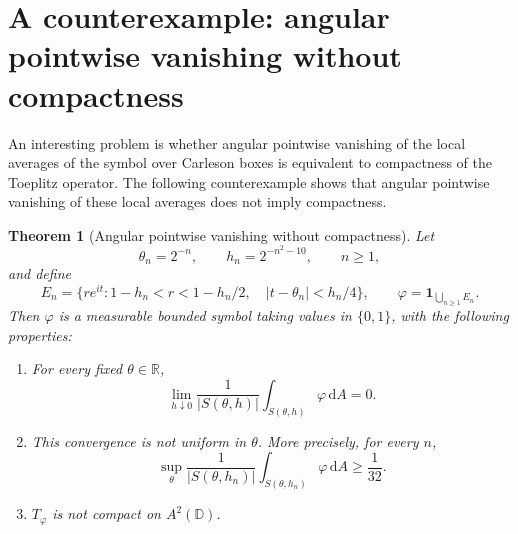 \documentclass[12pt,a4paper]{article}
\newtheorem{theorem}{Theorem}[section]
\theoremstyle{remark}
\newcommand{\D}{\mathbb D}
\newcommand{\dA}{\,\mathrm dA}
\newcommand{\A}{A^2(\D)}
\begin{document}
\section{A counterexample: angular pointwise vanishing without compactness}
An interesting problem is whether angular pointwise vanishing of the local averages of the symbol over Carleson boxes is equivalent to compactness of the Toeplitz operator. The following counterexample shows that angular pointwise vanishing of these local averages does not imply compactness.

\begin{theorem}[Angular pointwise vanishing without compactness]\label{thm:box-pointwise-counterexample}
Let
\[
\theta_n=2^{-n},\qquad h_n=2^{-n^2-10},\qquad n\ge1,
\]
and define
\[
E_n=\{re^{it}:1-h_n<r<1-h_n/2,\quad
                  |t-\theta_n|<h_n/4\},\qquad
\varphi=\mathbf1_{\bigcup_{n\ge1}E_n}.
\]
Then $\varphi$ is a measurable bounded symbol taking values in $\{0,1\}$, with the following properties:
\begin{enumerate}[label=\textnormal{(\roman*)}]
\item For every fixed $\theta\in\mathbb R$,
\begin{equation}\label{eq:counter-pointwise}
\lim_{h\downarrow0}\frac1{|S(\theta,h)|}
                  \int_{S(\theta,h)}\varphi\dA=0.
\end{equation}
\item This convergence is not uniform in $\theta$. More precisely, for every $n$,
\begin{equation}\label{eq:counter-nonuniform}
\sup_\theta\frac1{|S(\theta,h_n)|}
                  \int_{S(\theta,h_n)}\varphi\dA\ge\frac1{32}.
\end{equation}
\item $T_\varphi$ is not compact on $\A$.
\end{enumerate}
\end{theorem}
\end{document}
